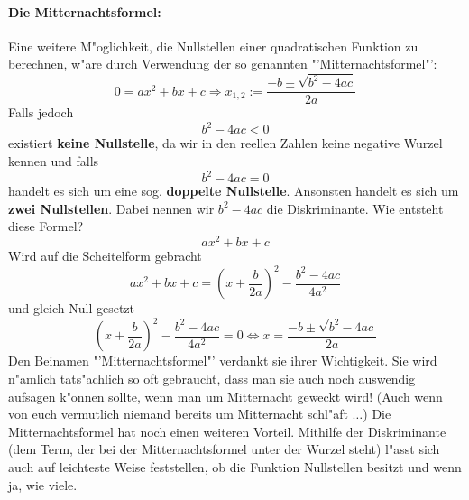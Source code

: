\paragraph{Die Mitternachtsformel:}
Eine weitere M"oglichkeit, die Nullstellen einer quadratischen Funktion zu berechnen, w"are durch Verwendung der so genannten "'Mitternachtsformel"':
\begin{equation*}
0 = ax^2 + bx + c \Rightarrow x_{1,2} := \frac{-b \pm \sqrt{b^2 - 4ac}}{2a}
\end{equation*}
Falls jedoch 
\begin{equation*}
b^2 - 4ac < 0
\end{equation*}
existiert \textbf{keine Nullstelle}, da wir in den reellen Zahlen keine negative Wurzel kennen und falls
\begin{equation*}
b^2 - 4ac = 0
\end{equation*}
handelt es sich um eine sog. \textbf{doppelte Nullstelle}. Ansonsten handelt es sich um \textbf{zwei Nullstellen}. Dabei nennen wir $b^2 - 4ac$ die Diskriminante.
Wie entsteht diese Formel?
\begin{equation*}
 ax^2 + bx + c 
\end{equation*}
Wird auf die Scheitelform gebracht
\begin{equation*}
 ax^2 + bx + c  = (x + \frac{b}{2a})^2 - \frac{b^2-4ac}{4a^2}
\end{equation*}
und gleich Null gesetzt
\begin{equation*}
(x + \frac{b}{2a})^2 - \frac{b^2-4ac}{4a^2} = 0 \iff x = \frac{-b \pm \sqrt{b^2 - 4ac}}{2a}
\end{equation*}
Den Beinamen "'Mitternachtsformel"' verdankt sie ihrer Wichtigkeit. Sie wird n"amlich tats"achlich so oft gebraucht, dass man sie auch noch auswendig aufsagen k"onnen sollte, wenn man um Mitternacht geweckt wird! (Auch wenn von euch vermutlich niemand bereits um Mitternacht schl"aft $\ldots$)
Die Mitternachtsformel hat noch einen weiteren Vorteil. Mithilfe der Diskriminante (dem Term, der bei der Mitternachtsformel unter der Wurzel steht) l"asst sich auch auf leichteste Weise feststellen, ob die Funktion Nullstellen besitzt und wenn ja, wie viele.

